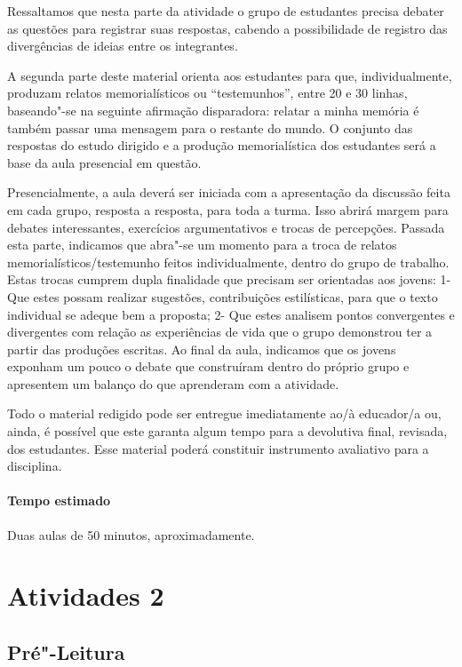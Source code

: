 \documentclass[11pt]{extarticle}
\begin{document}
Ressaltamos que nesta parte da atividade o
grupo de estudantes precisa debater as questões para registrar suas
respostas, cabendo a possibilidade de registro das divergências de
ideias entre os integrantes.

A segunda parte deste material orienta aos estudantes para que,
individualmente, produzam relatos memorialísticos ou ``testemunhos'',
entre 20 e 30 linhas, baseando"-se na seguinte afirmação disparadora:
relatar a minha memória é também passar uma mensagem para o restante do
mundo. O conjunto das respostas do estudo dirigido e a produção
memorialística dos estudantes será a base da aula presencial em questão.

Presencialmente, a aula deverá ser iniciada com a apresentação da
discussão feita em cada grupo, resposta a resposta, para toda a turma.
Isso abrirá margem para debates interessantes, exercícios argumentativos
e trocas de percepções. Passada esta parte, indicamos que abra"-se um
momento para a troca de relatos memorialísticos/testemunho feitos
individualmente, dentro do grupo de trabalho. Estas trocas cumprem dupla
finalidade que precisam ser orientadas aos jovens: 1- Que estes possam
realizar sugestões, contribuições estilísticas, para que o texto
individual se adeque bem a proposta; 2- Que estes analisem pontos
convergentes e divergentes com relação as experiências de vida que o
grupo demonstrou ter a partir das produções escritas. Ao final da aula,
indicamos que os jovens exponham um pouco o debate que construíram
dentro do próprio grupo e apresentem um balanço do que aprenderam com a
atividade.

Todo o material redigido pode ser entregue imediatamente ao/à educador/a
ou, ainda, é possível que este garanta algum tempo para a devolutiva
final, revisada, dos estudantes. Esse material poderá constituir
instrumento avaliativo para a disciplina.

\paragraph{Tempo estimado} Duas aulas de 50 minutos, aproximadamente.


\section{Atividades 2}


\subsection{Pré"-Leitura}
\end{document}
